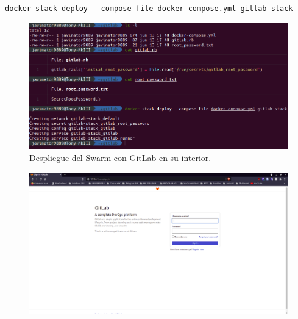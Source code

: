 \begin{lstlisting}[style=bash, caption={}]
docker stack deploy --compose-file docker-compose.yml gitlab-stack
\end{lstlisting}

\begin{figure}[H]
    \centering
    \includegraphics[width=.7\linewidth]{pictures/gitlab-swarm.png}
    \caption{Despliegue del Swarm con GitLab en su interior.}
    \label{fig:gitlab-swarm}
\end{figure}

\begin{figure}[H]
    \centering
    \includegraphics[width=\linewidth]{pictures/gitlab-deployed.png}
\end{figure}